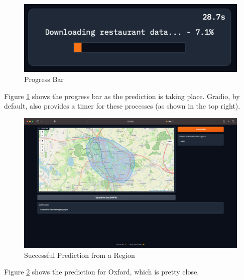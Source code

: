 \documentclass[12pt]{report}
\begin{document}
\begin{figure}[H]
\centering
\includegraphics[width=12cm]{ss12.4.png}
\caption{Progress Bar}\label{fig:ss12.4}
\end{figure}

Figure \ref{fig:ss12.4} shows the progress bar as the prediction is taking place. Gradio, by default, also provides a timer for these processes (as shown in the top right).

\begin{figure}[H]
\centering
\includegraphics[width=14cm]{ss12.5.png}
\caption{Successful Prediction from a Region}\label{fig:ss12.5}
\end{figure}

Figure \ref{fig:ss12.5} shows the prediction for Oxford, which is pretty close.

\begin{center}
\end{center}
\end{document}
